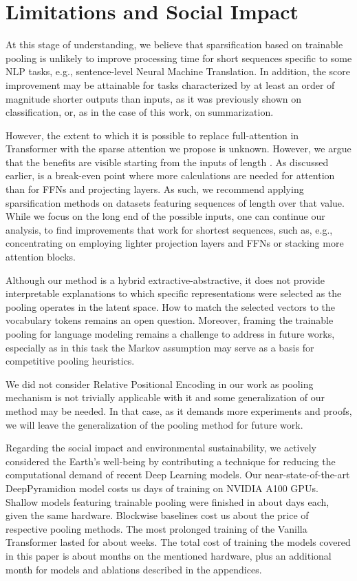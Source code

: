 \documentclass{article}
\begin{document}
\section{Limitations and Social Impact}\label{sec:limitions_and_social_impact}

At this stage of understanding, we believe that sparsification based on trainable pooling is unlikely to improve processing time for short sequences specific to some NLP tasks, e.g., sentence-level Neural Machine Translation. In addition, the score improvement may be attainable for tasks characterized by at least an order of magnitude shorter outputs than inputs, as it was previously shown on classification, or, as in the case of this work, on summarization.

However, the extent to which it is possible to replace full-attention in Transformer with the sparse attention we propose is unknown. However, we argue that the benefits are visible starting from the inputs of length . As discussed earlier,  is a break-even point where more calculations are needed for attention than for FFNs and projecting layers. As such, we recommend applying sparsification methods on datasets featuring sequences of length over that value.
While we focus on the long end of the possible inputs, one can continue our analysis, to find improvements that work for shortest sequences, such as, e.g., concentrating on employing lighter projection layers and FFNs or stacking more attention blocks.

Although our method is a hybrid extractive-abstractive, it does not provide interpretable explanations to which specific representations were selected as the pooling operates in the latent space. How to match the selected vectors to the vocabulary tokens remains an open question. 
Moreover, framing the trainable pooling for language modeling remains a challenge to address in future works, especially as in this task the Markov assumption may serve as a basis for competitive pooling heuristics.

We did not consider Relative Positional Encoding in our work as pooling mechanism
is not trivially applicable with it and some generalization of our method may be needed. In that case, as it demands more experiments and proofs, we will leave the generalization of the pooling method for future work.

Regarding the social impact and environmental sustainability, we actively considered the Earth's well-being by contributing a technique for reducing the computational demand of recent Deep Learning models.
Our near-state-of-the-art DeepPyramidion model costs us  days of training on  NVIDIA A100 GPUs. Shallow models featuring trainable pooling were finished in about  days each, given the same hardware. Blockwise baselines cost us about  the price of respective pooling methods. The most prolonged training of the  Vanilla Transformer lasted for about  weeks. The total cost of training the models covered in this paper is about  months on the mentioned hardware, plus an additional month for models and ablations described in the appendices.
\end{document}
